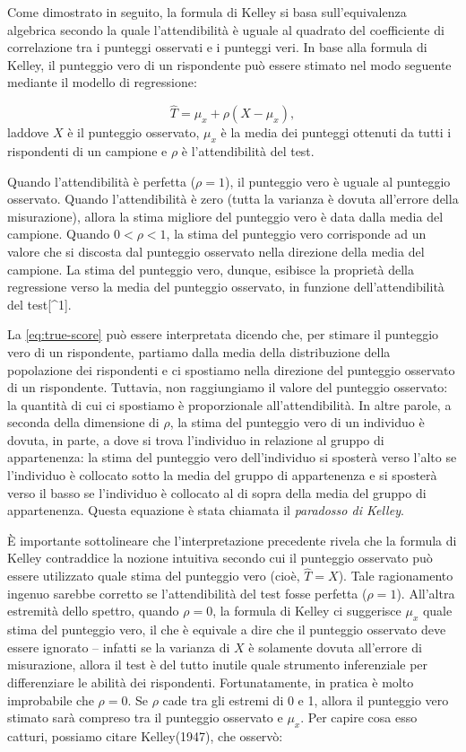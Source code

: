 \documentclass[
  11pt,
]{krantz}
\theoremstyle{definition}
\theoremstyle{definition}
\theoremstyle{definition}
\theoremstyle{definition}
\theoremstyle{remark}
\begin{document}
Come dimostrato in seguito, la formula di Kelley si basa sull'equivalenza algebrica secondo la quale l'attendibilità è uguale al quadrato del coefficiente di correlazione tra i punteggi osservati e i punteggi veri. In base alla formula di Kelley, il punteggio vero di un rispondente può essere stimato nel modo seguente mediante il modello di regressione:

\[
\hat{T} = \mu_x + \rho  (X - \mu_x),
\label{eq:true-score}
\] laddove \(X\) è il punteggio osservato, \(\mu_x\) è la media dei punteggi ottenuti da tutti i rispondenti di un campione e \(\rho\) è l'attendibilità del test.

Quando l'attendibilità è perfetta (\(\rho = 1\)), il punteggio vero è uguale al punteggio osservato. Quando l'attendibilità è zero (tutta la varianza è dovuta all'errore della misurazione), allora la stima migliore del punteggio vero è data dalla media del campione. Quando \(0 < \rho < 1\), la stima del punteggio vero corrisponde ad un valore che si discosta dal punteggio osservato nella direzione della media del campione. La stima del punteggio vero, dunque, esibisce la proprietà della regressione verso la media del punteggio osservato, in funzione dell'attendibilità del test{[}\^{}1{]}.

La \eqref{eq:true-score} può essere interpretata dicendo che, per stimare il punteggio vero di un rispondente, partiamo dalla media della distribuzione della popolazione dei rispondenti e ci spostiamo nella direzione del punteggio osservato di un rispondente. Tuttavia, non raggiungiamo il valore del punteggio osservato: la quantità di cui ci spostiamo è proporzionale all'attendibilità. In altre parole, a seconda della dimensione di \(\rho\), la stima del punteggio vero di un individuo è dovuta, in parte, a dove si trova l'individuo in relazione al gruppo di appartenenza: la stima del punteggio vero dell'individuo si sposterà verso l'alto se l'individuo è collocato sotto la media del gruppo di appartenenza e si sposterà verso il basso se l'individuo è collocato al di sopra della media del gruppo di appartenenza. Questa equazione è stata chiamata il \emph{paradosso di Kelley}.

È importante sottolineare che l'interpretazione precedente rivela che la formula di Kelley contraddice la nozione intuitiva secondo cui il punteggio osservato può essere utilizzato quale stima del punteggio vero (cioè, \(\hat{T} = X\)). Tale ragionamento ingenuo sarebbe corretto se l'attendibilità del test fosse perfetta (\(\rho = 1\)). All'altra estremità dello spettro, quando \(\rho = 0\), la formula di Kelley ci suggerisce \(\mu_x\) quale stima del punteggio vero, il che è equivale a dire che il punteggio osservato deve essere ignorato -- infatti se la varianza di \(X\) è solamente dovuta all'errore di misurazione, allora il test è del tutto inutile quale strumento inferenziale per differenziare le abilità dei rispondenti. Fortunatamente, in pratica è molto improbabile che \(\rho = 0\). Se \(\rho\) cade tra gli estremi di 0 e 1, allora il punteggio vero stimato sarà compreso tra il punteggio osservato e \(\mu_x\). Per capire cosa esso catturi, possiamo citare Kelley(1947), che osservò:
\end{document}
